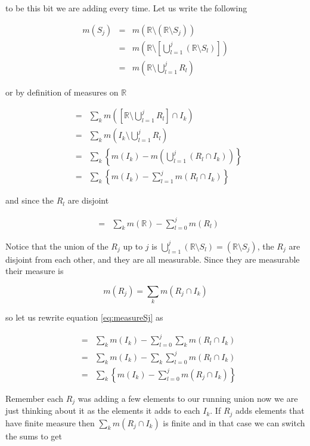 \documentclass[oneside]{book}
\begin{document}
\begin{enumerate}
to be this bit we are adding every time. Let us write the following

\begin{eqnarray}
m(S_j) &=& m(\mathbb{R} \setminus (\mathbb{R} \setminus S_j)) \nonumber\\
&=& m \left( \mathbb{R} \setminus \left[ \bigcup_{l=1}^{j} (\mathbb{R} \setminus S_l) \right] \right)\nonumber\\
&=& m\left(\mathbb{R} \setminus \bigcup_{l=1}^{j} R_l \right)
\end{eqnarray}

or by definition of measures on $\mathbb{R}$

\begin{eqnarray}
&=& \sum_k m\left(\left[ \mathbb{R} \setminus \bigcup_{l=1}^{j} R_l \right] \cap I_k \right) \nonumber \\
&=& \sum_k m\left( I_k \setminus \bigcup_{l=1}^{j} R_l  \right)\nonumber \\
&=& \sum_k \left\{ m( I_k)-m\left( \bigcup_{l=1}^{j} (R_l \cap I_k)  \right) \right\} \nonumber \\
&=& \sum_k \left\{ m( I_k)- \sum_{l=1}^j m(R_l \cap I_k)\right\}
\end{eqnarray}

 and since the $R_l$ are disjoint
 
\begin{eqnarray}
\label{eq:measureSj}
&=& \sum_k m(\mathbb{R}) - \sum_{l=0}^j m\left( R_l \right)
\end{eqnarray}
 
Notice that the union of the $R_j$ up to $j$ is $\bigcup_{l=1}^j (\mathbb{R} \setminus S_l)=(\mathbb{R} \setminus S_j)$, the $R_j$ are disjoint from each other, and they are all measurable. Since they are measurable their measure is

\begin{equation}
m(R_j) = \sum_k m(R_j \cap I_k)
\end{equation}

so let us rewrite equation \ref{eq:measureSj} as
 
\begin{eqnarray}
&=& \sum_k m(I_k) - \sum_{l=0}^j \sum_k m(R_l \cap I_k) \nonumber\\
&=& \sum_k m(I_k) - \sum_k \sum_{l=0}^j m(R_l \cap I_k) \nonumber\\
&=& \sum_k \left\{ m(I_k) -\sum_{l=0}^j  m(R_j \cap I_k) \right\}
\end{eqnarray}

Remember each $R_j$ was adding a few elements to our running union now we are just thinking about it as the elements it adds to each $I_k$. If $R_j$ adds elements that have finite measure then $\sum_k m(R_j \cap I_k)$ is finite and in that case we can switch the sums to get


\end{enumerate}
\end{document}
